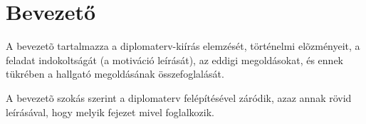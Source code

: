 \chapter*{Bevezető}

A bevezetõ tartalmazza a diplomaterv-kiírás elemzését, történelmi elõzményeit, a feladat indokoltságát (a motiváció leírását), az eddigi megoldásokat, és ennek tükrében a hallgató megoldásának összefoglalását.

A bevezetõ szokás szerint a diplomaterv felépítésével záródik, azaz annak rövid leírásával, hogy melyik fejezet mivel foglalkozik.

